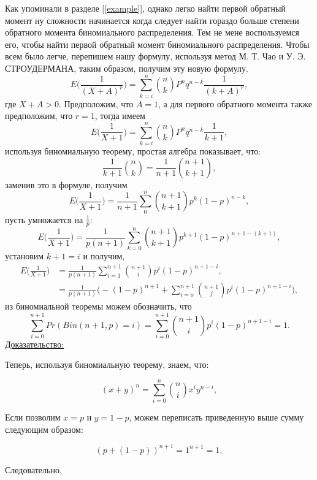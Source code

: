 \documentclass[13pt]{article}
\begin{document}
Как упоминали в разделе [\ref{example}], однако легко найти первой обратный момент ну сложности начинается когда следует найти гораздо больше степени обратного момента биномиального распределения. Тем не мене воспользуемся его, чтобы найти первой обратный момент биномиального распределения. Чтобы всем было легче, перепишем нашу формулу, используя метод М. Т. Чао и У. Э. СТРОУДЕРМАНА, таким образом, получим эту новую формулу.
\[
 E\bigg(\frac{1}{(X+A)^{r}}\bigg) =  \sum_{k=i}^{n} \binom{n}{k} P^{n}q^{n-k} \frac{1}{(k+A)^r},
\]
где $X+A>0$. Предположим, что $A=1$, а для первого обратного момента также предположим, что $r=1$, тогда имеем
\[
 E\bigg(\frac{1}{X+1}\bigg) =  \sum_{k=i}^{n} \binom{n}{k} P^{n}q^{n-k} \frac{1}{k+1},
\]
используя биномиальную теорему, простая алгебра показывает, что:
\[
\frac{1}{k+1}\binom{n}{k}=\frac{1}{n+1}\binom{n+1}{k+1},
\]
заменив это в формуле, получим
\[
 E\bigg(\frac{1}{X+1}\bigg)= \frac{1}{n+1}\sum_{0}^{n}\binom{n+1}{k+1}p^{k}(1-p)^{n-k},
\]
пусть умножается на $\frac{1}{p}$:
\[
E\bigg(\frac{1}{X+1}\bigg)= \frac{1}{p(n+1)}\sum_{k=0}^{n}\binom{n+1}{k+1}p^{k+1}(1-p)^{n+1-(k+1)},
\]
установим $k+1=i$ и получим,
\begin{align}
E\bigg(\frac{1}{X+1}\bigg)   &=\frac{1}{p(n+1)}\sum_{i=1}^{n+1}\binom{n+1}{i}p^{i}(1-p)^{n+1-i}, \\
&=\frac{1}{p(n+1)}\Bigg(-(1-p)^{n+1}+\sum_{i=o}^{n+1}\binom{n+1}{j}p^{i}(1-p)^{n+1-i}\Bigg),
\end{align}
из биномиальной теоремы можем обозначить, что
\[
\sum_{i=0}^{n+1}Pr(Bin(n+1,p)=i)=\sum_{i=0}^{n+1}\binom{n+1}{i}p^{i}(1-p)^{n+1-i}=1.
\]
\underline{Доказательство:}

Теперь, используя биномиальную теорему, знаем, что:

\[ (x+y)^{n} = \sum_{i=0}^{n} \binom{n}{i} x^{i} y^{n-i}, \]

Если позволим \( x = p \) и \( y = 1-p \), можем переписать приведенную выше сумму следующим образом:

\[ (p + (1-p))^{n+1} = 1^{n+1} = 1, \]

Следовательно,
\end{document}
